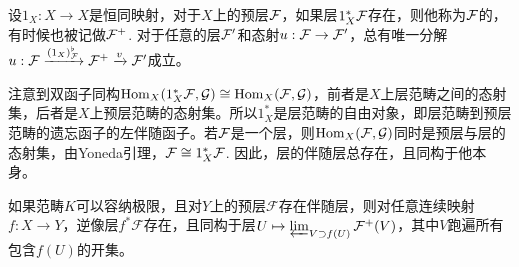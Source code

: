 \begin{para}[伴随层]
设$1_X:X\to X$是恒同映射，对于$X$上的预层$\mathcal{F}$，如果层$1_X^*\mathcal{F}$存在，则他称为$\mathcal{F}$的，有时候也被记做$\mathcal{F}^+$. 对于任意的层$\mathcal{F}'$和态射$u:\mathcal{F}\to\mathcal{F}'$，总有唯一分解$u:\mathcal{F}\xrightarrow{(1_X)^\flat_{\mathcal{F}}} \mathcal{F}^+ \xrightarrow{v} \mathcal{F}'$成立。
\end{para}

注意到双函子同构$\operatorname{Hom}_X (1_X^* \mathcal{F},\mathcal{G})\cong \operatorname{Hom}_X(\mathcal{F},\mathcal{G})$，前者是$X$上层范畴之间的态射集，后者是$X$上预层范畴的态射集。所以$1_X^*$是层范畴的自由对象，即层范畴到预层范畴的遗忘函子的左伴随函子。若$\mathcal{F}$是一个层，则$\operatorname{Hom}_X(\mathcal{F},\mathcal{G})$同时是预层与层的态射集，由Yoneda引理，$\mathcal{F}\cong 1_X^* \mathcal{F}$. 因此，层的伴随层总存在，且同构于他本身。

\begin{lem}
如果范畴$K$可以容纳极限，且对$Y$上的预层$\mathcal{F}$存在伴随层，则对任意连续映射$f :X\to Y$，逆像层$f^*\mathcal{F}$存在，且同构于层$U\mapsto \varprojlim_{V\supset f(U)} \mathcal{F}^+(V)$，其中$V$跑遍所有包含$f(U)$的开集。
\end{lem}

